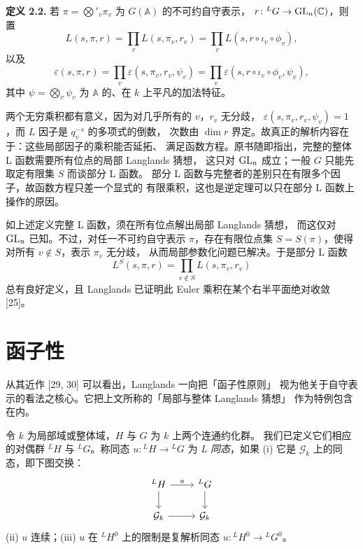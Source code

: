 \par\medskip\noindent\textbf{定义 2.2.}\quad
若 $\pi=\bigotimes'_v\pi_v$ 为 $G(\mathbb{A})$ 的不可约自守表示，
$r\colon{}^{L}G\to\mathrm{GL}_n(\mathbb{C})$，则置
\[
  L(s,\pi,r)=\prod_v L(s,\pi_v,r_v)
  =\prod_v L(s,r\circ\iota_v\circ\phi_v),
\]
以及
\[
  \varepsilon(s,\pi,r)=\prod_v\varepsilon(s,\pi_v,r_v,\psi_v)
  =\prod_v\varepsilon(s,r\circ\iota_v\circ\phi_v,\psi_v),
\]
其中 $\psi=\bigotimes_v\psi_v$ 为 $\mathbb{A}$ 的、在 $k$ 上平凡的加法特征。
\begin{annote}
两个无穷乘积都有意义，因为对几乎所有的 $v$，$r_v$ 无分歧，
$\varepsilon(s,\pi_v,r_v,\psi_v)=1$，而 $L$ 因子是 $q_v^{-s}$ 的多项式的倒数，
次数由 $\dim r$ 界定。故真正的解析内容在于：这些局部因子的乘积能否延拓、
满足函数方程。原书随即指出，完整的整体 L 函数需要所有位点的局部 Langlands 猜想，
这只对 $\mathrm{GL}_n$ 成立；一般 $G$ 只能先取定有限集 $S$ 而谈部分 L 函数。
部分 L 函数与完整者的差别只在有限多个因子，故函数方程只差一个显式的
有限乘积，这也是逆定理可以只在部分 L 函数上操作的原因。
\par{}
\end{annote}

如上述定义完整 L 函数，须在所有位点解出局部 Langlands 猜想，
而这仅对 $\mathrm{GL}_n$ 已知。不过，对任一不可约自守表示 $\pi$，存在有限位点集
$S=S(\pi)$，使得对所有 $v\notin S$，表示 $\pi_v$ 无分歧，
从而局部参数化问题已解决。于是部分 L 函数
\[
  L^{S}(s,\pi,r)=\prod_{v\notin S}L(s,\pi_v,r_v)
\]
总有良好定义，且 Langlands 已证明此 Euler 乘积在某个右半平面绝对收敛 [25]。

\section{函子性}

从其近作 [29, 30] 可以看出，Langlands 一向把「函子性原则」
视为他关于自守表示的看法之核心。它把上文所称的「局部与整体 Langlands 猜想」
作为特例包含在内。

令 $k$ 为局部域或整体域，$H$ 与 $G$ 为 $k$ 上两个连通约化群。
我们已定义它们相应的对偶群 ${}^{L}H$ 与 ${}^{L}G$。称同态
$u\colon{}^{L}H\to{}^{L}G$ 为 \emph{L 同态}，如果
(i) 它是 $\mathcal{G}_k$ 上的同态，即下图交换：
\[
\begin{tikzcd}
  {}^{L}H \arrow[r,"u"] \arrow[d] & {}^{L}G \arrow[d] \\
  \mathcal{G}_k \arrow[r] & \mathcal{G}_k
\end{tikzcd}
\]
(ii) $u$ 连续；(iii) $u$ 在 ${}^{L}H^{0}$ 上的限制是复解析同态
$u\colon{}^{L}H^{0}\to{}^{L}G^{0}$。

